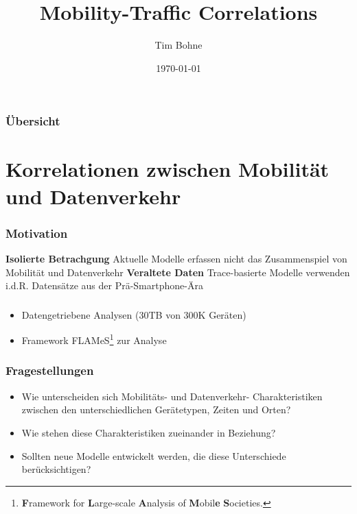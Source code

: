 \documentclass{beamer}
\title[]{Mobility-Traffic Correlations}
\author{Tim Bohne}
\institute[]
{
\textit{Bachelor-Seminar: Mobility and Traffic in Computer Networks}
\medskip
}
\date{\today}
\begin{document}
\begin{frame}[plain] %
\titlepage %
\end{frame}

\begin{frame}
\frametitle{Übersicht} %
\tableofcontents
\end{frame}

\section{Korrelationen zwischen Mobilität und Datenverkehr}

\begin{frame}
\frametitle{Motivation}
\textit{}
\newline\newline\newline
\textbf{Isolierte Betrachgung}\newline
Aktuelle Modelle erfassen nicht das Zusammenspiel von Mobilität und Datenverkehr\newline\newline
\textbf{Veraltete Daten}\newline
Trace-basierte Modelle verwenden i.d.R. Datensätze aus der Prä-Smartphone-Ära
\begin{figure}
\centering
\end{figure}
\end{frame}

\begin{frame}
\frametitle{}
\begin{itemize}
  \item Datengetriebene Analysen ($30$\textsc{TB} von $300$\textsc{K} Geräten)
  \item Framework FLAMeS\footnote{\textbf{F}ramework for \textbf{L}arge-scale \textbf{A}nalysis of 
  \textbf{M}obil\textbf{e} \textbf{S}ocieties.} zur Analyse
\end{itemize}
\end{frame}

\begin{frame}
  \frametitle{Fragestellungen}
  \begin{itemize}
    \item Wie unterscheiden sich Mobilitäts- und Datenverkehr- Charakteristiken zwischen den unterschiedlichen Gerätetypen,
    Zeiten und Orten?\newline
    \item Wie stehen diese Charakteristiken zueinander in Beziehung?\newline
    \item Sollten neue Modelle entwickelt werden, die diese Unterschiede berücksichtigen?
\end{itemize}
\end{frame}
\end{document}
